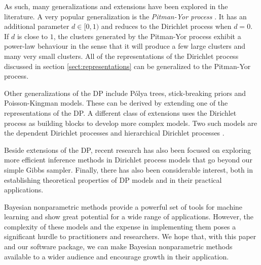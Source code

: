 \documentclass[final,3p,times,twocolumn]{elsarticle}
\begin{document}
As such, many generalizations and extensions have been explored in the literature.
A very popular generalization is the \emph{Pitman-Yor process} \cite{pitman1997,teh2006a}.
It has an additional parameter $d \in [0,1)$ and reduces to the Dirichlet process when $d=0$.
If $d$ is close to $1$, the clusters generated by the Pitman-Yor process exhibit a power-law behaviour in the sense that it will produce a few large clusters and many very small clusters.
All of the representations of the Dirichlet process discussed in section \ref{sect:representations} can be generalized to the Pitman-Yor process.

Other generalizations of the DP include P\'olya trees, stick-breaking priors and Poisson-Kingman models.
These can be derived by extending one of the representations of the DP.
A different class of extensions uses the Dirichlet process as building blocks to develop more complex models.
Two such models are the dependent Dirichlet processes \cite{maceachern1999} and hierarchical Dirichlet processes \cite{teh2006b}. 

Beside extensions of the DP, recent research has also been focused on exploring more efficient inference methods in Dirichlet process models that go beyond our simple Gibbs sampler.
Finally, there has also been considerable interest, both in establishing theoretical properties of DP models and in their practical applications.

Bayesian nonparametric methods provide a powerful set of tools for machine learning and show great potential for a wide range of applications. 
However, the complexity of these models and the expense in implementing them poses a significant hurdle to practitioners and researchers.
We hope that, with this paper and our software package, we can make Bayesian nonparametric methods available to a wider audience and encourage growth in their application.



\end{document}
